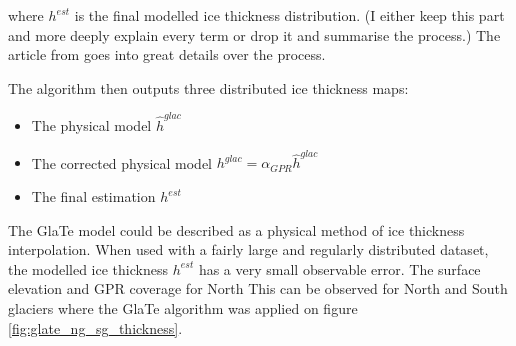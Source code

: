 \documentclass[a4, 12pt]{article}
\begin{document}
where $h^{est}$ is the final modelled ice thickness distribution. (I either keep this part and more deeply explain every term or drop it and summarise the process.) The article from \citeauthor{langhammer2019glacier} goes into great details over the process. 
 
The algorithm then outputs three distributed ice thickness maps:
\begin{itemize}
\item The physical model $\hat{h}^{glac}$
\item The corrected physical model $h^{glac} = \alpha_{GPR}\hat{h}^{glac}$
\item The final estimation $h^{est}$
\end{itemize}

The GlaTe model could be described as a physical method of ice thickness interpolation. When used with a fairly large and regularly distributed dataset, the modelled ice thickness $h^{est}$ has a very small observable error. The surface elevation and GPR coverage for North 
This can be observed for North and South glaciers where the GlaTe algorithm was applied on figure \ref{fig:glate_ng_sg_thickness}.
\\
\end{document}

